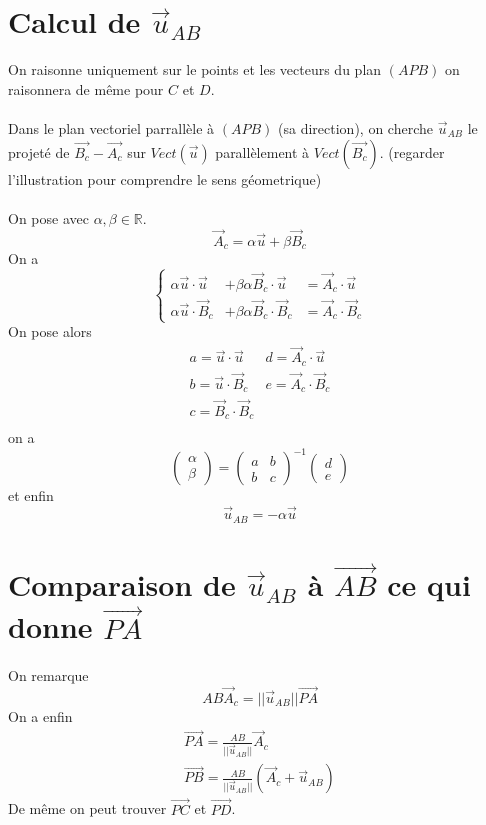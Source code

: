 \documentclass{article}
\begin{document}
\section{Calcul de $\vec{u}_{AB}$}
On raisonne uniquement sur le points et les vecteurs du plan $(APB)$ on raisonnera de même pour $C$ et $D$.\\
\\Dans le plan vectoriel parrallèle à $(APB)$ (sa direction), on cherche $\vec{u}_{AB}$ le projeté de $\vec{B_c}-\vec{A_c}$ sur $Vect(\vec u)$ parallèlement à $Vect(\vec{B_c})$. (regarder l'illustration pour comprendre le sens géometrique)\\
\\
On pose avec $\alpha, \beta \in \mathbb{R}$.
$$
\vec{A}_c = \alpha \vec{u} + \beta \vec{B}_c
$$
On a 
$$
\left\lbrace\begin{matrix}
\alpha \vec u \cdot \vec u &+ \beta \alpha \vec{B}_c \cdot \vec u &= \vec{A}_c \cdot \vec u \\
\alpha \vec u \cdot \vec{B}_c &+ \beta \alpha \vec{B}_c \cdot \vec{B}_c &= \vec{A}_c \cdot \vec{B}_c
\end{matrix}\right.
$$
On pose alors
$$
\begin{matrix}
a = \vec u \cdot \vec u & d = \vec{A}_c \cdot \vec u \\
b = \vec u \cdot \vec{B}_c & e = \vec{A}_c \cdot \vec{B}_c \\
c = \vec{B}_c \cdot \vec{B}_c &\\
\end{matrix}
$$
on a
$$
\begin{pmatrix}
\alpha \\ \beta
\end{pmatrix} = \begin{pmatrix}
a & b \\
b & c
\end{pmatrix}^{-1} \begin{pmatrix}
d \\ e
\end{pmatrix}
$$
et enfin 
$$
\vec{u}_{AB} = -\alpha \vec u
$$


\section{Comparaison de $\vec{u}_{AB}$ à $\vec{AB}$ ce qui donne $\vec{PA}$}
On remarque
$$
AB\vec{A}_c = ||\vec{u}_{AB}||\vec{PA}
$$
On a enfin
\begin{align*}
\vec{PA} = \frac{AB}{||\vec{u}_{AB}||}\vec{A}_c \\
\vec{PB} = \frac{AB}{||\vec{u}_{AB}||}(\vec{A}_c + \vec{u}_{AB})
\end{align*}
De même on peut trouver $\vec{PC}$ et $\vec{PD}$.
\end{document}
